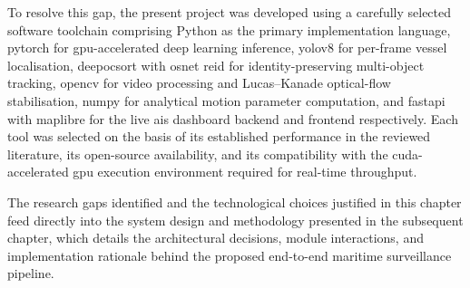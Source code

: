 To resolve this gap, the present project was developed using a carefully selected
software toolchain comprising Python as the primary implementation language,
\gls{pytorch} for \gls{gpu}-accelerated deep learning inference, \gls{yolov8} for per-frame vessel
localisation, \gls{deepocsort} with \gls{osnet} \gls{reid} for identity-preserving multi-object
tracking, \gls{opencv} for video processing and Lucas--Kanade optical-flow stabilisation,
\gls{numpy} for analytical motion parameter computation, and \gls{fastapi} with \gls{maplibre}
for the live \gls{ais} dashboard backend and frontend respectively. Each tool was
selected on the basis of its established performance in the reviewed literature,
its open-source availability, and its compatibility with the \gls{cuda}-accelerated
\gls{gpu} execution environment required for real-time throughput.

The research gaps identified and the technological choices justified in this
chapter feed directly into the system design and methodology presented in the
subsequent chapter, which details the architectural decisions, module interactions,
and implementation rationale behind the proposed end-to-end maritime surveillance
pipeline.